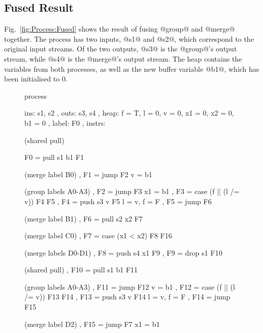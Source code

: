 \subsection{Fused Result}

Fig.~\ref{fig:Process:Fused} shows the result of fusing @group@ and @merge@ together.
The process has two inputs, @s1@ and @s2@, which correspond to the original input streams.
Of the two outputs, @s3@ is the @group@'s output stream, while @s4@ is the @merge@'s output stream.
The heap contains the variables from both processes, as well as the new buffer variable @b1@, which has been initialised to $0$.



\begin{figure}
\begin{code}
            process
            { ins:    { s1, s2 }
            , outs:   { s3, s4 }
            , heap:   { f = T, l = 0, v = 0, x1 = 0, x2 = 0, b1 = 0}
            , label:  F0
            , instrs:

  (shared pull)
              { F0  = pull s1 b1            F1  {}

  (merge label B0)
              , F1  = jump                  F2  {v  = b1}

  (group labels A0-A3)
              , F2  = jump                  F3  {x1 = b1}
              , F3  = case (f || (l /= v))  F4  {}                F5  {}
              , F4  = push s3 v             F5  {l  = v, f  = F}
              , F5  = jump                  F6  {}

  (merge label B1)
              , F6  = pull s2 x2            F7  {}

  (merge label C0)
              , F7  = case (x1 < x2)        F8  {}                F16 {}

  (merge labels D0-D1)
              , F8  = push s4 x1            F9  {}
              , F9  = drop s1               F10 {}

  (shared pull)
              , F10 = pull s1 b1            F11 {}

  (group labels A0-A3)
              , F11 = jump                  F12 {v  = b1}
              , F12 = case (f || (l /= v))  F13 {}                F14 {}
              , F13 = push s3 v             F14 {l  = v, f  = F}
              , F14 = jump                  F15 {}

  (merge label D2)
              , F15 = jump                  F7  {x1 = b1}

}}
\end{code}
\end{figure}

